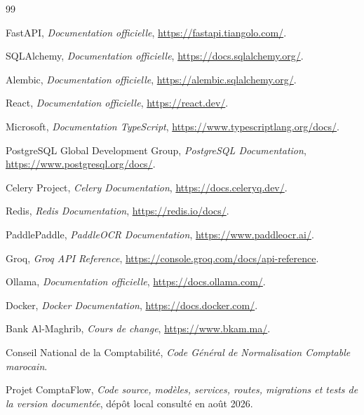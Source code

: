 \documentclass[12pt,a4paper,oneside]{report}
\begin{document}
\begin{thebibliography}{99}

FastAPI, \textit{Documentation officielle}, \url{https://fastapi.tiangolo.com/}.

SQLAlchemy, \textit{Documentation officielle}, \url{https://docs.sqlalchemy.org/}.

Alembic, \textit{Documentation officielle}, \url{https://alembic.sqlalchemy.org/}.

React, \textit{Documentation officielle}, \url{https://react.dev/}.

Microsoft, \textit{Documentation TypeScript}, \url{https://www.typescriptlang.org/docs/}.

PostgreSQL Global Development Group, \textit{PostgreSQL Documentation}, \url{https://www.postgresql.org/docs/}.

Celery Project, \textit{Celery Documentation}, \url{https://docs.celeryq.dev/}.

Redis, \textit{Redis Documentation}, \url{https://redis.io/docs/}.

PaddlePaddle, \textit{PaddleOCR Documentation}, \url{https://www.paddleocr.ai/}.

Groq, \textit{Groq API Reference}, \url{https://console.groq.com/docs/api-reference}.

Ollama, \textit{Documentation officielle}, \url{https://docs.ollama.com/}.

Docker, \textit{Docker Documentation}, \url{https://docs.docker.com/}.

Bank Al-Maghrib, \textit{Cours de change}, \url{https://www.bkam.ma/}.

Conseil National de la Comptabilité, \textit{Code Général de Normalisation Comptable marocain}.

Projet ComptaFlow, \textit{Code source, modèles, services, routes, migrations et tests de la version documentée}, dépôt local consulté en août 2026.

\end{thebibliography}

\appendix
\renewcommand{\chaptername}{Annexe}
\end{document}
